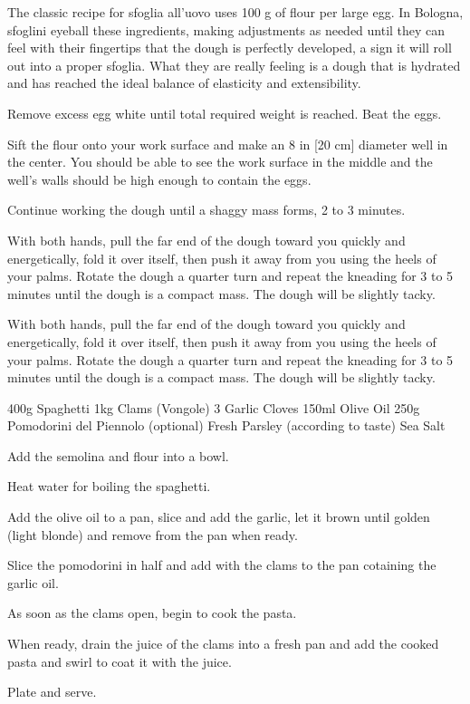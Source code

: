 \begin{method}
	The classic recipe for sfoglia all’uovo uses 100 g of flour per large egg. In Bologna, sfoglini eyeball these 
	ingredients, making adjustments as needed until they can feel with their fingertips that the dough is perfectly 
	developed, a sign it will roll out into a proper sfoglia. What they are really feeling is a dough that is hydrated 
	and has reached the ideal balance of elasticity and extensibility.

	Remove excess egg white until total required weight is reached.  Beat the eggs.

	Sift the flour onto your work surface and make an 8 in [20 cm] diameter well in the center. 
	You should be able to see the work surface in the middle and the well’s walls should be high enough 
	to contain the eggs.

	Continue working the dough until a shaggy mass forms, 2 to 3 minutes.

	With both hands, pull the far end of the dough toward you quickly and energetically, fold it over itself, 
	then push it away from you using the heels of your palms. Rotate the dough a quarter turn and repeat the 
	kneading for 3 to 5 minutes until the dough is a compact mass. The dough will be slightly tacky.
	
	With both hands, pull the far end of the dough toward you quickly and energetically, fold it over itself, 
	then push it away from you using the heels of your palms. Rotate the dough a quarter turn and repeat 
	the kneading for 3 to 5 minutes until the dough is a compact mass. The dough will be slightly tacky.

\end{method}

\label{rec:pasta-spaghetti-vongole-napoli}

\begin{ingreds}
	400g Spaghetti
	1kg Clams (Vongole)
	3 Garlic Cloves
	150ml Olive Oil
	250g Pomodorini del Piennolo (optional)
	Fresh Parsley (according to taste)
	Sea Salt
\end{ingreds}

\begin{method}		
     	Add the semolina and flour into a bowl.

	Heat water for boiling the spaghetti.

	Add the olive oil to a pan, slice and add the garlic, let it brown until golden (light blonde) and remove from the pan when ready.

	Slice the pomodorini in half and add with the clams to the pan cotaining the garlic oil.

	As soon as the clams open, begin to cook the pasta.

	When ready, drain the juice of the clams into a fresh pan and add the cooked pasta and swirl to coat it with the juice.

	Plate and serve.

\end {method}




